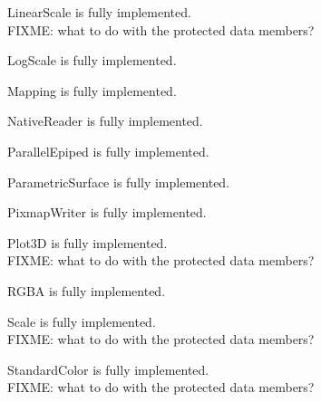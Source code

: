 \documentclass{manual}
\begin{document}
\begin{classdesc*}{LinearScale}
  is fully implemented.\\
  FIXME: what to do with the protected data members?
\end{classdesc*}

\begin{classdesc*}{LogScale}
  is fully implemented.
\end{classdesc*}

\begin{classdesc*}{Mapping}
  is fully implemented.
\end{classdesc*}

\begin{classdesc*}{NativeReader}
  is fully implemented.
\end{classdesc*}

\begin{classdesc*}{ParallelEpiped}
  is fully implemented.
\end{classdesc*}

\begin{classdesc*}{ParametricSurface}
  is fully implemented.
\end{classdesc*}

\begin{classdesc*}{PixmapWriter}
  is fully implemented.
\end{classdesc*}

\begin{classdesc*}{Plot3D}
  is fully implemented.\\
  FIXME: what to do with the protected data members?\\
\end{classdesc*}

\begin{classdesc*}{RGBA}
  is fully implemented.
\end{classdesc*}

\begin{classdesc*}{Scale}
  is fully implemented.\\
  FIXME: what to do with the protected data members?
\end{classdesc*}

\begin{classdesc*}{StandardColor}
  is fully implemented.\\
  FIXME: what to do with the protected data members?
\end{classdesc*}
\end{document}

